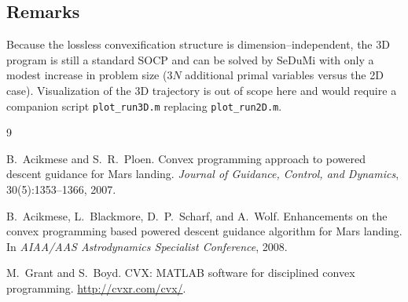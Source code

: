 \documentclass[11pt]{article}
\begin{document}
\subsection{Remarks}

Because the lossless convexification structure is
dimension--independent, the 3D program is still a standard SOCP
and can be solved by SeDuMi with only a modest increase in
problem size ($3N$ additional primal variables versus the 2D
case).  Visualization of the 3D trajectory is out of scope here
and would require a companion script \texttt{plot\_run3D.m}
replacing \texttt{plot\_run2D.m}.

\begin{thebibliography}{9}

B.~Acikmese and S.~R.~Ploen.
\newblock Convex programming approach to powered descent guidance
         for Mars landing.
\newblock \emph{Journal of Guidance, Control, and Dynamics},
         30(5):1353--1366, 2007.

B.~Acikmese, L.~Blackmore, D.~P.~Scharf, and A.~Wolf.
\newblock Enhancements on the convex programming based powered
         descent guidance algorithm for Mars landing.
\newblock In \emph{AIAA/AAS Astrodynamics Specialist Conference},
         2008.

M.~Grant and S.~Boyd.
\newblock CVX: MATLAB software for disciplined convex programming.
\newblock \url{http://cvxr.com/cvx/}.

\end{thebibliography}
\end{document}
